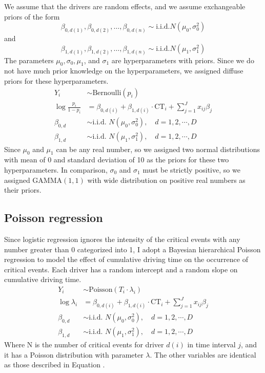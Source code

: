 \documentclass[12pt]{book}
\numberwithin{equation}{chapter}
\begin{document}
We assume that the drivers are random effects, and we assume exchangeable priors of the form
\[
\beta_{0, d(1)}, \beta_{0, d(2)}, \ldots , \beta_{0, d(n)} \sim \text{i.i.d.} N(\mu_0,\sigma_0^2)
\]
and
\[
\beta_{1, d(1)}, \beta_{1, d(2)}, \ldots , \beta_{1, d(n)} \sim \text{i.i.d.} N(\mu_1,\sigma_1^2)
\]
The parameters \(\mu_0, \sigma_0, \mu_1\), and \(\sigma_1\) are hyperparameters with priors. Since we do not have much prior knowledge on the hyperparameters, we assigned diffuse priors for these hyperparameters.
\[
\begin{split}
Y_{i} &\sim \text{Bernoulli}(p_{i})\\
\log\frac{p_{i}}{1-p_{i}} &= \beta_{0, d(i)} + \beta_{1, d(i)} \cdot \text{CT}_i + \sum_{j=1}^{J} x_{ij}\beta_j\\
\beta_{0, d} &\sim \text{i.i.d. } N(\mu_0, \sigma_0^2), \quad d = 1, 2, \cdots, D\\
\beta_{1, d} &\sim \text{i.i.d. } N(\mu_1, \sigma_1^2), \quad d = 1, 2, \cdots, D
\label{eq:priors}
\end{split}
\]
Since \(\mu_0\) and \(\mu_1\) can be any real number, so we assigned two normal distributions with mean of 0 and standard deviation of 10 as the priors for these two hyperparameters. In comparison, \(\sigma_0\) and \(\sigma_1\) must be strictly positive, so we assigned GAMMA\((1, 1)\) with wide distribution on positive real numbers as their priors.

\hypertarget{poisson-regression}{%
\subsection{Poisson regression}\label{poisson-regression}}

Since logistic regression ignores the intensity of the critical events with any number greater than 0 categorized into 1, I adopt a Bayesian hierarchical Poisson regression to model the effect of cumulative driving time on the occurrence of critical events. Each driver has a random intercept and a random slope on cumulative driving time.
\[
\begin{split}
Y_{i}  & \sim \text{Poisson}(T_i\cdot\lambda_i)\\
\log\lambda_{i} & =\beta_{0, d(i)} + \beta_{1, d(i)} \cdot \text{CT}_i + \sum_{j=1}^{J} x_{ij}\beta_j\\
\beta_{0, d} &\sim \text{i.i.d. } N(\mu_0, \sigma_0^2), \quad d = 1, 2, \cdots, D\\
\beta_{1, d} &\sim \text{i.i.d. } N(\mu_1, \sigma_1^2), \quad d = 1, 2, \cdots, D
\label{eq:hierarchicalpoisson}
\end{split}
\]
Where N is the number of critical events for driver \(d(i)\) in time interval \(j\), and it has a Poisson distribution with parameter \(\lambda\). The other variables are identical as those described in Equation .
\end{document}
